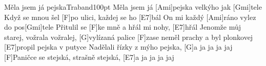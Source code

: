 \begin{song}{Měla jsem já pejska}{Traband}{100pt}
Měla jsem já [Ami]pejska velkýho jak [Gmi]tele
Když se mnou šel [F]po ulici, každej se ho [E7]bál
On mi každý [Ami]ráno vylez do pos[Gmi]tele
Přitulil se [F]ke mně a hřál mi nohy, [E7]hřál
\smallskip
\rl [Ami]Jenomže můj starej, vožrala vožralej,
[G]vylízaná palice
[F]zase neměl prachy a byl plonkovej
[E7]propil pejska v putyce \rr{}
\smallskip
\rl [Ami]Nadělali řízky z mýho pejska,
[G]a ja ja ja jaj
[F]Paničce se stejská, strašně stejská,
[E7]a ja ja ja jaj \rr{}
\end{song}
